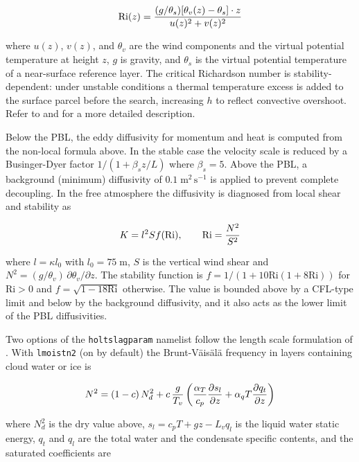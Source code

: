 \begin{eqnarray}
  \mathrm{Ri}(z) = { (g/\theta_s)[\theta_v(z)-\theta_s] \cdot z \over
                     u(z)^2 + v(z)^2 }
\end{eqnarray}

where $u(z)$, $v(z)$, and $\theta_v$ are the wind components and the
virtual potential temperature at height $z$, $g$ is gravity, and $\theta_s$
is the virtual potential temperature of a near-surface reference layer.
The critical Richardson number is stability-dependent: under unstable conditions
a thermal temperature excess is added to the surface parcel before the search,
increasing $h$ to reflect convective overshoot.
Refer to \cite{Holtslag_90} and \cite{Holtslag_93} for a more detailed
description.

Below the PBL, the eddy diffusivity for momentum and heat is computed from the
non-local formula above.  In the stable case the velocity scale is reduced by a
Businger-Dyer factor $1/(1+\beta_s z/L)$ where $\beta_s = 5$.
Above the PBL, a background (minimum) diffusivity of $0.1\;\mathrm{m^2\,s^{-1}}$
is applied to prevent complete decoupling.  In the free atmosphere the diffusivity
is diagnosed from local shear and stability as

\begin{eqnarray}
K = l^2 S f(\mathrm{Ri}), \qquad \mathrm{Ri} = {N^2 \over S^2}
\end{eqnarray}

where $l = \kappa l_0$ with $l_0 = 75\;\mathrm{m}$, $S$ is the vertical
wind shear and $N^2 = (g/\theta_v)\,\partial\theta_v/\partial z$.  The
stability function is $f = 1/(1+10\mathrm{Ri}(1+8\mathrm{Ri}))$ for
$\mathrm{Ri} > 0$ and $f = \sqrt{1-18\mathrm{Ri}}$ otherwise.  The value is
bounded above by a CFL-type limit and below by the background diffusivity, and
it also acts as the lower limit of the PBL diffusivities.

Two options of the \verb=holtslagparam= namelist follow the length scale
formulation of \cite{Lenderink_04}.  With \verb=lmoistn2= (on by default) the Brunt-V\"ais\"al\"a frequency in layers containing
cloud water or ice is

\begin{eqnarray}
N^2 = (1-c)\,N^2_d + c\,{g \over T_v}
  \left( {\alpha_T \over c_p} {\partial s_l \over \partial z} +
  \alpha_q T {\partial q_t \over \partial z} \right)
\end{eqnarray}

where $N^2_d$ is the dry value above, $s_l = c_pT + gz - L_v q_l$ is the liquid
water static energy, $q_t$ and $q_l$ are the total water and the condensate
specific contents, and the saturated coefficients are \citep{Cuijpers_93}

